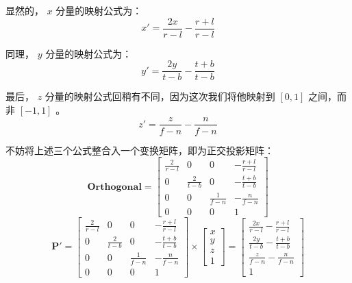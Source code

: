 \documentclass[12pt,oneside,a4paper]{ctexart}
\begin{document}
显然的， $x$ 分量的映射公式为：
\begin{equation*}
	x'=\frac{2x}{r-l}-\frac{r+l}{r-l}
\end{equation*}

同理， $y$ 分量的映射公式为：
\begin{equation*}
	y'=\frac{2y}{t-b}-\frac{t+b}{t-b}
\end{equation*}

最后， $z$ 分量的映射公式回稍有不同，因为这次我们将他映射到 $[0,1]$ 之间，而非 $[-1,1]$ 。
\begin{equation*}
	z'=\frac{z}{f-n}-\frac{n}{f-n}
\end{equation*}

不妨将上述三个公式整合入一个变换矩阵，即为正交投影矩阵：
\begin{equation}
	\mathbf{Orthogonal}=
	\begin{bmatrix}
		\frac{2}{r-l} & 0             & 0             & -\frac{r+l}{r-l} \\
		0             & \frac{2}{t-b} & 0             & -\frac{t+b}{t-b} \\
		0             & 0             & \frac{1}{f-n} & -\frac{n}{f-n}   \\
		0             & 0             & 0             & 1
	\end{bmatrix}
\end{equation}
\begin{equation*}
	\mathbf{P'}=
	\begin{bmatrix}
		\frac{2}{r-l} & 0             & 0             & -\frac{r+l}{r-l} \\
		0             & \frac{2}{t-b} & 0             & -\frac{t+b}{t-b} \\
		0             & 0             & \frac{1}{f-n} & -\frac{n}{f-n}   \\
		0             & 0             & 0             & 1
	\end{bmatrix}
	\times
	\begin{bmatrix}
		x \\
		y \\
		z \\
		1
	\end{bmatrix}
	=
	\begin{bmatrix}
		\frac{2x}{r-l}-\frac{r+l}{r-l} \\
		\frac{2y}{t-b}-\frac{t+b}{t-b} \\
		\frac{z}{f-n}-\frac{n}{f-n}    \\
		1
	\end{bmatrix}
\end{equation*}
\end{document}
